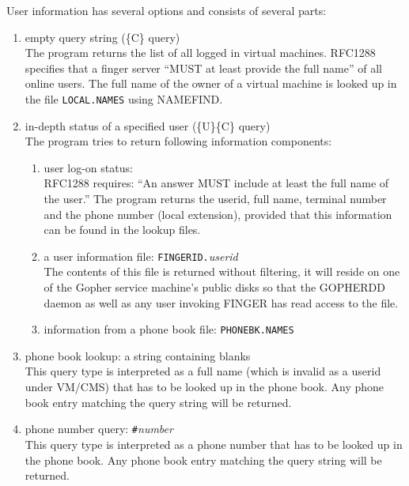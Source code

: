 \noindent User information has several options and consists of several parts:

\begin{enumerate} 
\item empty query string (\{C\} query)\\
     The program returns the list of all logged in virtual machines.
     RFC1288 specifies that a finger server ``MUST at least provide the
     full name'' of all online users.  The full name of the owner of a
     virtual machine is looked up in the file
     {\tt LOCAL.NAMES} using NAMEFIND.
 
\item in-depth status of a specified user (\{U\}\{C\} query)\\
     The program tries to return following information components:

\begin{enumerate}
\item user log-on status:\\
        RFC1288 requires: ``An answer MUST include at least the full name
        of the user.''  The program returns the userid, full name,
        terminal number and the phone number (local extension), provided
        that this information can be found in the lookup files.
 
\item a user information file: {\tt FINGERID.}{\sl{userid}}\\
        The contents of this file is returned
        without filtering, it will reside on one of the Gopher service
        machine's public disks so that the GOPHERDD daemon as well as any
        user invoking FINGER has read access to the file.
 
\item information from a phone book file: {\tt PHONEBK.NAMES}
\end{enumerate}

\item phone book lookup: a string containing blanks\\
     This query type is interpreted as a full name (which is invalid as
     a userid under VM/CMS) that has to be looked up in the phone book.
     Any phone book entry matching the query string will be returned.
 
\item phone number query: {\tt \#}{\sl{number}}\\
     This query type is interpreted as a phone number that has to be
     looked up in the phone book.  Any phone book entry matching the
     query string will be returned.
\end{enumerate}

